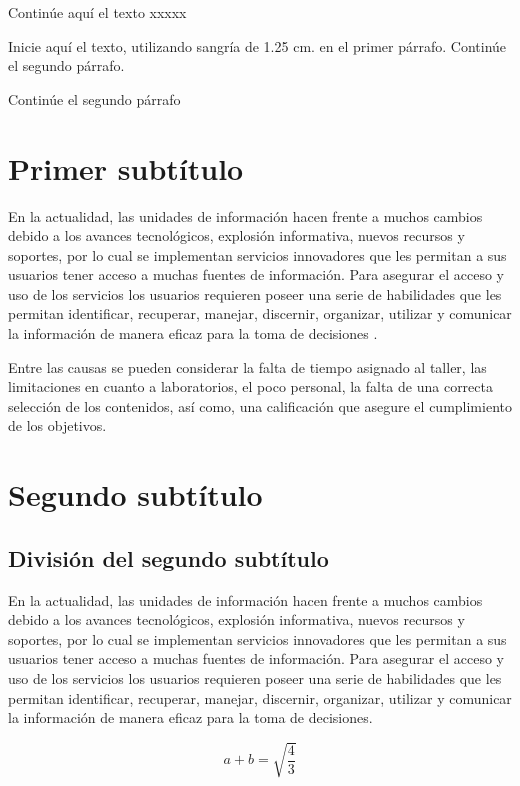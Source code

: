   Continúe aquí el texto xxxxx
  
Inicie aquí el texto, utilizando sangría de 1.25 cm. en el primer
párrafo. Continúe el segundo párrafo.

Continúe el segundo párrafo

\section{Primer subtítulo}

En la actualidad, las unidades de información hacen frente a muchos cambios
debido a los avances tecnológicos, explosión informativa, nuevos recursos y
soportes, por lo cual se implementan servicios innovadores que les permitan a
sus usuarios tener acceso a muchas fuentes de información. Para asegurar el
acceso y uso de los servicios los usuarios requieren poseer una serie de
habilidades que les permitan identificar, recuperar, manejar, discernir,
organizar, utilizar y comunicar la información de manera eficaz para la toma de
decisiones \cite{citacion1}.

Entre las causas se pueden considerar la falta de tiempo asignado al taller,
las limitaciones en cuanto a laboratorios, el poco personal, la falta de una
correcta selección de los contenidos, así como, una calificación que asegure el
cumplimiento de los objetivos.


\section{Segundo subtítulo}

\subsection{División del segundo subtítulo}

En la actualidad, las unidades de información hacen frente a muchos cambios
debido a los avances tecnológicos, explosión informativa, nuevos recursos y
soportes, por lo cual se implementan servicios innovadores que les permitan a
sus usuarios tener acceso a muchas fuentes de información. Para asegurar el
acceso y uso de los servicios los usuarios requieren poseer una serie de
habilidades que les permitan identificar, recuperar, manejar, discernir,
organizar, utilizar y comunicar la información de manera eficaz para la toma de
decisiones.

\begin{equation}
  \label{eq:1}
  a+b=\sqrt{\frac{4}{3}}
\end{equation}

